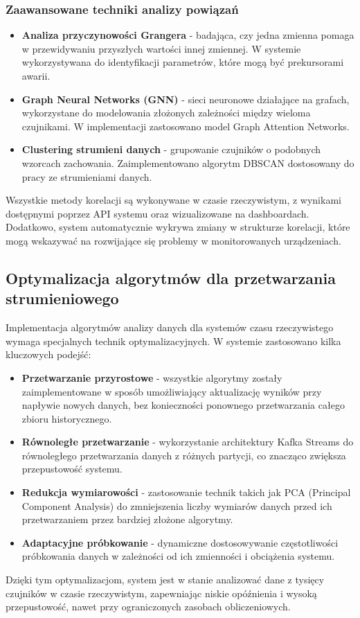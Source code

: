 \subsubsection{Zaawansowane techniki analizy powiązań}
\label{subsubsec:zaawansowane_korelacje}

\begin{itemize}
    \item \textbf{Analiza przyczynowości Grangera} - badająca, czy jedna zmienna pomaga w przewidywaniu przyszłych wartości innej zmiennej. W systemie wykorzystywana do identyfikacji parametrów, które mogą być prekursorami awarii.
    \item \textbf{Graph Neural Networks (GNN)} - sieci neuronowe działające na grafach, wykorzystane do modelowania złożonych zależności między wieloma czujnikami. W implementacji zastosowano model Graph Attention Networks.
    \item \textbf{Clustering strumieni danych} - grupowanie czujników o podobnych wzorcach zachowania. Zaimplementowano algorytm DBSCAN dostosowany do pracy ze strumieniami danych.
\end{itemize}

Wszystkie metody korelacji są wykonywane w czasie rzeczywistym, z wynikami dostępnymi poprzez API systemu oraz wizualizowane na dashboardach. Dodatkowo, system automatycznie wykrywa zmiany w strukturze korelacji, które mogą wskazywać na rozwijające się problemy w monitorowanych urządzeniach.

\subsection{Optymalizacja algorytmów dla przetwarzania strumieniowego}
\label{subsec:optymalizacja_algorytmow}

Implementacja algorytmów analizy danych dla systemów czasu rzeczywistego wymaga specjalnych technik optymalizacyjnych. W systemie zastosowano kilka kluczowych podejść:

\begin{itemize}
    \item \textbf{Przetwarzanie przyrostowe} - wszystkie algorytmy zostały zaimplementowane w sposób umożliwiający aktualizację wyników przy napływie nowych danych, bez konieczności ponownego przetwarzania całego zbioru historycznego.
    \item \textbf{Równoległe przetwarzanie} - wykorzystanie architektury Kafka Streams do równoległego przetwarzania danych z różnych partycji, co znacząco zwiększa przepustowość systemu.
    \item \textbf{Redukcja wymiarowości} - zastosowanie technik takich jak PCA (Principal Component Analysis) do zmniejszenia liczby wymiarów danych przed ich przetwarzaniem przez bardziej złożone algorytmy.
    \item \textbf{Adaptacyjne próbkowanie} - dynamiczne dostosowywanie częstotliwości próbkowania danych w zależności od ich zmienności i obciążenia systemu.
\end{itemize}

Dzięki tym optymalizacjom, system jest w stanie analizować dane z tysięcy czujników w czasie rzeczywistym, zapewniając niskie opóźnienia i wysoką przepustowość, nawet przy ograniczonych zasobach obliczeniowych. 